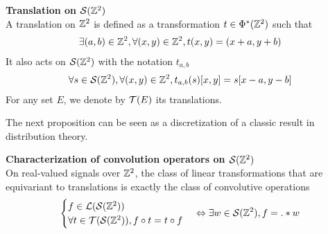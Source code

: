 \begin{definition}\textbf{Translation on $\mathcal{S}(\mathbb{Z}^2)$}\\
A translation on $\mathbb{Z}^2$ is defined as a transformation $t \in \Phi^*(\mathbb{Z}^2)$ such that
\begin{gather*}
\exists (a,b) \in \mathbb{Z}^2, \forall (x,y) \in \mathbb{Z}^2, t(x,y) = (x+a,y+b)
\end{gather*}
It also acts on $\mathcal{S}(\mathbb{Z}^2)$ with the notation $t_{a,b}$ \ie
\begin{gather*}
\forall s \in \mathcal{S}(\mathbb{Z}^2), \forall (x,y) \in \mathbb{Z}^2, t_{a,b}(s)[x,y] = s[x-a, y-b]
\end{gather*}
For any set $E$, we denote by $\mathcal{T}(E)$ its translations.
\end{definition}

The next proposition can be seen as a discretization of a classic result in distribution theory.

\begin{proposition}\textbf{Characterization of convolution operators on $\mathcal{S}(\mathbb{Z}^2)$}\\
On real-valued signals over $\mathbb{Z}^2$, the class of linear transformations that are equivariant to translations is exactly the class of convolutive operations \ie
\begin{gather*}
\begin{cases}
 f \in \mathcal{L}(\mathcal{S}(\mathbb{Z}^2))\\
 \forall t \in \mathcal{T}(\mathcal{S}(\mathbb{Z}^2)), f \circ t = t \circ f
\end{cases}
 \Leftrightarrow \exists w \in \mathcal{S}(\mathbb{Z}^2), f = . \ast w
\end{gather*}
\label{prop:equi}
\end{proposition}

